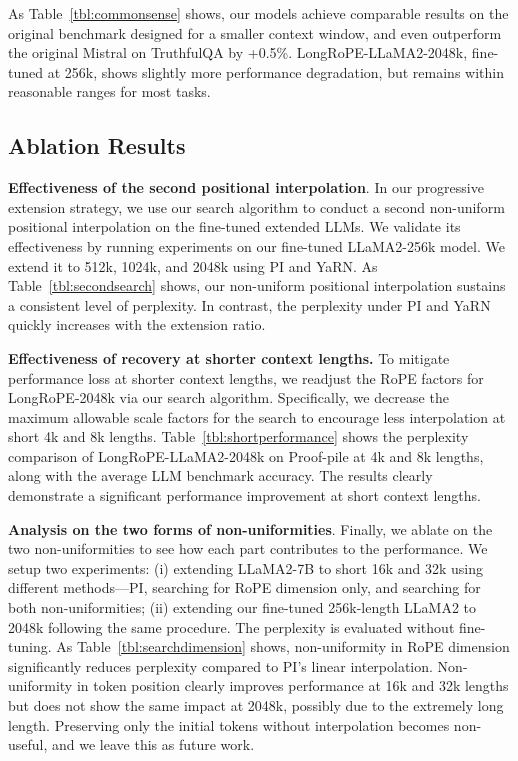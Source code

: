 As Table~\ref{tbl:commonsense} shows, our models achieve comparable results on the original benchmark designed for a smaller context window, and even outperform the original Mistral on TruthfulQA by +0.5\%. LongRoPE-LLaMA2-2048k, fine-tuned at 256k, shows slightly more performance degradation, but remains within reasonable ranges for most tasks. 

\subsection{Ablation Results}

\textbf{Effectiveness of the second positional interpolation}. In our progressive extension strategy, we use our search algorithm to conduct a second non-uniform positional interpolation on the fine-tuned extended LLMs. We validate its effectiveness by running experiments on our fine-tuned LLaMA2-256k model.  We extend it to 512k, 1024k, and 2048k using PI and YaRN. As Table~\ref{tbl:secondsearch} shows, our non-uniform positional interpolation sustains a consistent level of perplexity.  In contrast, the perplexity under PI and YaRN quickly increases with the extension ratio. 

\textbf{Effectiveness of recovery at shorter context lengths.} To mitigate performance loss at shorter context lengths, we readjust the RoPE factors for LongRoPE-2048k via our search algorithm. Specifically, we decrease the maximum allowable scale factors for the search to encourage less interpolation at short 4k and 8k lengths. 
 Table~\ref{tbl:shortperformance} shows the perplexity comparison of LongRoPE-LLaMA2-2048k on Proof-pile at 4k and 8k lengths, along with the average LLM benchmark accuracy.  The results clearly demonstrate a significant performance improvement at short context lengths. 

\textbf{Analysis on the two forms of non-uniformities}. Finally, we ablate on the two non-uniformities to see how each part contributes to the performance. We setup two experiments: (i) extending LLaMA2-7B to short 16k and 32k using different methods—PI, searching for RoPE dimension only, and searching for both non-uniformities; (ii) extending our fine-tuned 256k-length LLaMA2 to 2048k following the same procedure.  The perplexity is evaluated without fine-tuning. As Table~\ref{tbl:searchdimension} shows, non-uniformity in RoPE dimension significantly reduces perplexity compared to PI's linear interpolation. Non-uniformity in token position clearly improves performance at 16k and 32k lengths  but does not show the same impact at 2048k, possibly due to the extremely long length. Preserving only the initial tokens without interpolation becomes non-useful, and we leave this as future work.

